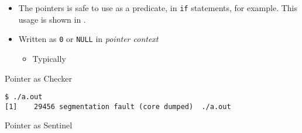 \begin{itemize}[noitemsep]
\item The  pointers is safe to use as a predicate, in \texttt{if} statements, for example.
  This usage is shown in .
\item Written as \texttt{0} or \texttt{NULL} in \emph{pointer context}
  \begin{itemize}
  \item Typically 
  \end{itemize}
\end{itemize}

\begin{listing}[h!tbp]
\caption{\texorpdfstring{}{\texttt{NULL}} Pointer as Checker}
\label{lst:NULL_Pointer-Checker}

\begin{verbatim}
$ ./a.out
[1]    29456 segmentation fault (core dumped)  ./a.out
\end{verbatim}
\end{listing}

\begin{listing}[h!tbp]
\caption{\texorpdfstring{}{\texttt{NULL}} Pointer as Sentinel}
\label{lst:NULL_Pointer-Sentinel}
\end{listing}



